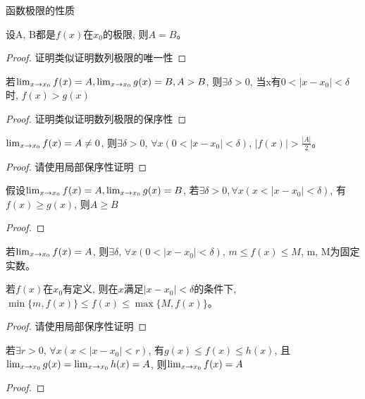 \documentclass[lang=cn]{elegantbook}
\begin{document}
函数极限的性质
\begin{theorem}[函数极限的唯一性]
    设A, B都是$f(x)$在$x_0$的极限, 则$A=B$。 
\end{theorem}
\begin{proof}
    证明类似证明数列极限的唯一性
\end{proof}

\begin{theorem}[函数极限的局部保序性]
    若$\lim_{x \to x_0 } f(x) = A, \lim_{x \to x_0 } g(x) = B, A > B$, 则$\exists \delta > 0$, 当x有$0 < \left| x - x_0 \right| < \delta $时, $f(x) > g(x)$  
\end{theorem}
\begin{proof}
    证明类似证明数列极限的保序性
\end{proof}

\begin{lemma}
    $\lim_{x \to x_0 } f(x) = A \neq 0$, 则$\exists \delta > 0$, $\forall x ( 0 < \left| x - x_0\right| < \delta)$, $\left| f(x) \right| > \frac{\left| A \right|}{2}$。
\end{lemma}
\begin{proof}
    请使用局部保序性证明
\end{proof}

\begin{lemma}
    假设$\lim_{x \to x_0 } f(x) = A, \lim_{x \to x_0 } g(x) = B$, 若$\exists \delta > 0, \forall x (x < \left| x - x_0\right| < \delta)$, 有$f(x) \ge g(x)$, 则$A \ge B$
\end{lemma}
\begin{proof}

\end{proof}


\begin{theorem}[函数极限的局部有界性]
    若$\lim_{x \to x_0 } f(x) = A$, 则$\exists \delta$, $\forall x(0 < \left| x - x_0 \right| < \delta)$, $m \le f(x) \le M$, m, M为固定实数。

    若$f(x)$在$x_0$有定义, 则在$x$满足$\left| x - x_0 \right| < \delta$的条件下, $\min\{m, f(x)\} \le f(x) \le \max\{M, f(x)\}$。
\end{theorem}
\begin{proof}
    请使用局部保序性证明
\end{proof}

\begin{theorem}[函数极限的夹逼性定理]
    若$\exists r > 0$, $\forall x(x < \left| x - x_0 \right| < r)$, 有$g(x) \le f(x) \le h(x)$, 且$\lim_{x \to x_0 } g(x) = \lim_{x \to x_0 } h(x) = A$, 则$\lim_{x \to x_0 } f(x) = A$
\end{theorem}
\begin{proof}
    
\end{proof}
\end{document}
